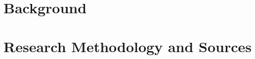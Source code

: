 \documentclass{report}
\begin{document}




\section{Background}




\section{Research Methodology and Sources}

\end{document}
